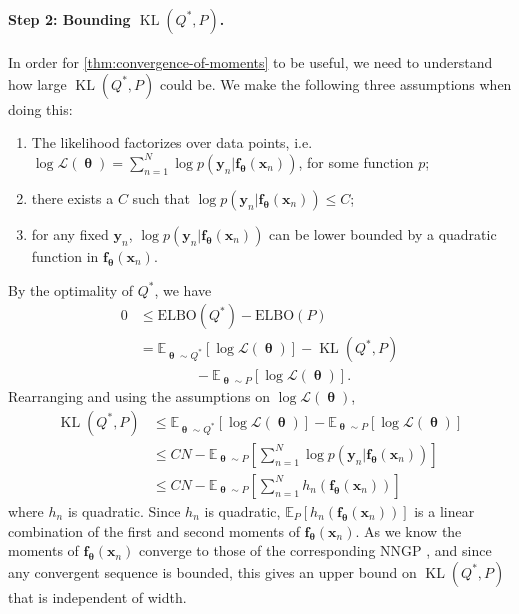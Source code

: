 \documentclass[twoside]{article}
\newcommand{\vf}{\mathbf{f}}
\newcommand{\vx}{\mathbf{x}}
\newcommand{\vy}{\mathbf{y}}
\newcommand{\vtheta}{\bm{\uptheta}}
\newcommand{\E}{\mathbb{E}}
\renewcommand{\P}{\mathbb{P}}
\newcommand{\Q}{\mathbb{Q}}
\renewcommand{\Q}{\ensuremath{Q}}
\renewcommand{\P}{\ensuremath{P}}
\newcommand{\KL}{\operatorname{KL}}
\theoremstyle{theoremstyle}
\begin{document}
\paragraph{Step 2: Bounding $\KL(Q^*, P)$.}

In order for \cref{thm:convergence-of-moments} to be useful, we need to understand how large $\KL(\Q^*,\P)$ could be. We make the following three assumptions when doing this:
\begin{enumerate}[label=(\roman*)]\itemsep0pt
   \item The likelihood factorizes over data points, i.e.~$\log \mathcal{L}(\vtheta) = \sum_{n=1}^N \log p(\vy_n | \vf_{\vtheta}(\vx_n))$, for some function $p$;
    \item there exists a $C$ such that $\log p(\vy_n | \vf_{\vtheta}(\vx_n)) \leq C$;
    \item for any fixed $\vy_n$, $\log p(\vy_n | \vf_{\vtheta}(\vx_n))$ can be lower bounded by a quadratic function in $\vf_{\vtheta}(\vx_n)$.
\end{enumerate}

By the optimality of $\Q^*$, we have
\begin{align}
	0 &\leq \text{ELBO}(Q^*) -  \text{ELBO}(P) \\
	&= \mathbb{E}_{\vtheta\sim Q^*}[\log \mathcal{L}(\vtheta)]- \KL(Q^*, P) \nonumber\\
	&\qquad\qquad- \mathbb{E}_{\vtheta\sim P}[\log \mathcal{L}(\vtheta)].     
\end{align}
Rearranging and using the assumptions on $\log \mathcal{L}(\vtheta)$,
\begin{align}
    \!\!\!\KL(Q^*, P) &\leq \mathbb{E}_{\vtheta\sim Q^*}[\log \mathcal{L}(\vtheta)] -\mathbb{E}_{\vtheta\sim P}[\log \mathcal{L}(\vtheta)]\\
    & \leq \!CN \!-\! \mathbb{E}_{\vtheta\sim P}[\textstyle\sum_{n=1}^N \!\log p(\vy_n | \vf_{\vtheta}(\vx_n))] \\
    & \leq \! CN \!-\! \E_{\vtheta \sim \P}[\textstyle\sum_{n=1}^N h_n(\vf_{\vtheta}(\vx_n))]
\end{align} 
where $h_n$ is quadratic. Since $h_n$ is quadratic, $\E_{\P}[h_n(\vf_{\vtheta}(\vx_n))]$ is a linear combination of the first and second moments of $\vf_{\vtheta}(\vx_n)$. As we know the moments of $\vf_{\vtheta}(\vx_n)$ converge to those of the corresponding NNGP \citep{matthews_2018}, and since any convergent sequence is bounded, this gives an upper bound on $\KL(\Q^*,\P)$ that is independent of width. 
\end{document}

